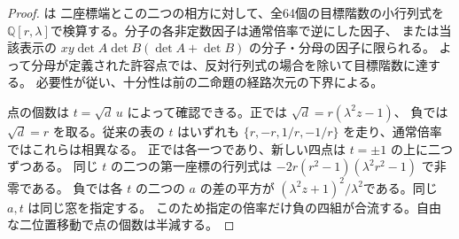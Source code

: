 \begin{proof}
 は
二座標端とこの二つの相方に対して、全64個の目標階数の小行列式を
$\mathbb Q[r,\lambda]$で検算する。分子の各非定数因子は通常倍率で逆にした因子、
または当該表示の $xy\det A\det B(\det A+\det B)$ の分子・分母の因子に限られる。
よって分母が定義された許容点では、反対行列式の場合を除いて目標階数に達する。
必要性が従い、十分性は前の二命題の経路次元の下界による。

点の個数は $t=\sqrt d\,u$ によって確認できる。正では $\sqrt d=r(\lambda^2z-1)$、
負では $\sqrt d=r$ を取る。従来の表の $t$ はいずれも
$\{r,-r,1/r,-1/r\}$ を走り、通常倍率ではこれらは相異なる。
正では各一つであり、新しい四点は $t=\pm1$ の上に二つずつある。
同じ $t$ の二つの第一座標の行列式は
$-2r(r^2-1)(\lambda^2 r^2-1)$ で非零である。
負では各 $t$ の二つの $a$ の差の平方が
$(\lambda^2z+1)^2/\lambda^2$である。同じ $a,t$ は同じ窓を指定する。
このため指定の倍率だけ負の四組が合流する。自由な二位置移動で点の個数は半減する。
\end{proof}
